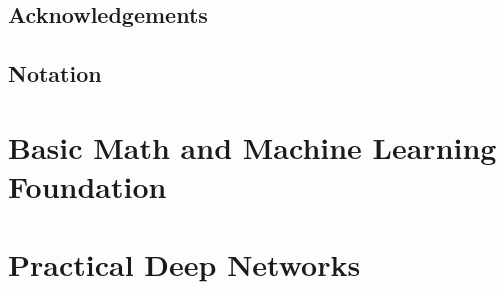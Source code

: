 \documentclass[10pt,\papersize,twoside,openright]{book}
\theoremstyle{definition}
\theoremstyle{remark}
\begin{document}
\setcounter{page}{1}
\frontmatter

\tableofcontents

\chapter*{Acknowledgements}


\chapter*{Notation}


\mainmatter



\part{Basic Math and Machine Learning Foundation}









\part{Practical Deep Networks}




\end{document}
